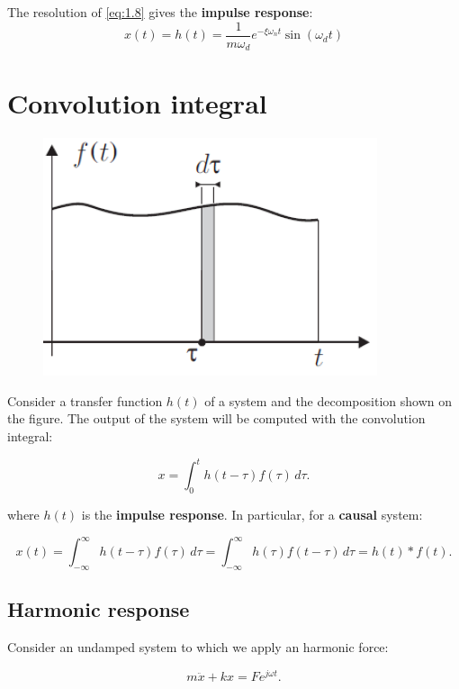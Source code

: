 				The resolution of \eqref{eq:1.8} gives the \textbf{impulse response}:
				\begin{equation}
				x(t) = h(t) = \frac{1}{m\omega _d} e^{- \xi\omega _n t} \sin (\omega _d t)
\end{equation}				 

	\section{Convolution integral}
		\begin{figure}
		\vspace{-5mm}
		\includegraphics[scale=0.4]{vibration/ch1/8}
		\end{figure}
		Consider a transfer function $h(t)$ of a system and the decomposition shown on the figure. The output of the system will be computed with the convolution integral:
		
		\begin{equation}
		x = \int _0^t h(t-\tau)f(\tau) \, d\tau.
		\end{equation}
		
		where $h(t)$ is the \textbf{impulse response}. In particular, for a \textbf{causal} system:
		
		\begin{equation}
		x(t) = \int _{-\infty}^{\infty} h(t-\tau)f(\tau)\, d\tau = \int _{-\infty}^{\infty} h(\tau)f(t-\tau)\, d\tau = h(t)*f(t).
				\label{eq:1.13}
		\end{equation}	
		
		\subsection{Harmonic response}
			Consider an undamped system	to which we apply an harmonic force:
			
			\begin{equation}
			m \ddot{x} + kx = F e^{j\omega t}.
			\end{equation}
			
